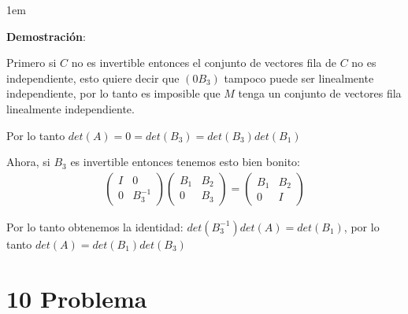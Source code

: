 \documentclass[12pt, fleqn]{article}                             %
\newenvironment{SmallIndentation}[1][0.75em]                    %
        {\begin{adjustwidth}{#1}{}\begin{footnotesize}}             %
        {\end{footnotesize}\end{adjustwidth}}                       %
\theoremstyle{break}                                            %
\newcommand{\pVector}[1]                                        %
        { \ensuremath{\begin{pmatrix}#1\end{pmatrix}} }             %
\begin{document}
    \begin{SmallIndentation}[1em]
        \textbf{Demostración}:
        
        Primero si $C$ no es invertible entonces el conjunto de vectores fila de $C$
        no es independiente, esto quiere decir que $(0 B_3)$ tampoco puede ser linealmente
        independiente, por lo tanto es imposible que $M$ tenga un conjunto de vectores
        fila linealmente independiente.

        Por lo tanto $det(A) = 0 = det(B_3) = det(B_3) det(B_1)$

        Ahora, si $B_3$ es invertible entonces tenemos esto bien bonito:
        \begin{align*}
            \pVector{I & 0 \\ 0 & B_3^{-1}} \pVector{B_1 & B_2 \\ 0 & B_3} = \pVector{B_1 & B_2 \\ 0 & I}
        \end{align*}

        Por lo tanto obtenemos la identidad:
        $det(B_3^{-1}) det(A) = det(B_1)$, por lo tanto $det(A) = det(B_1) det(B_3)$
    
    \end{SmallIndentation}




\clearpage
\section{10 Problema}
\end{document}

